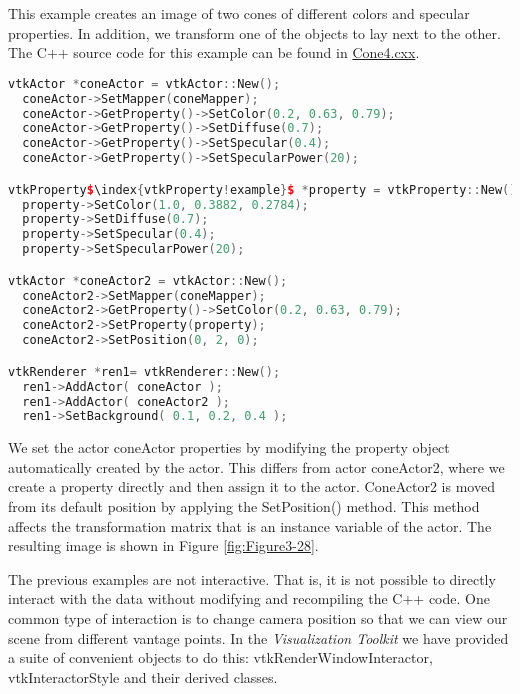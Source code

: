 \begin{description}[leftmargin=0cm,labelindent=0cm]
This example creates an image of two cones of different colors and specular properties. In addition, we transform one of the objects to lay next to the other. The C++ source code for this example can be found in \href{https://lorensen.github.io/VTKExamples/site/Cxx/Rendering/Cone4/}{Cone4.cxx}.

\begin{lstlisting}[language=C++, caption={Cone4.cxx}, escapechar=\$]
vtkActor *coneActor = vtkActor::New();
  coneActor->SetMapper(coneMapper);
  coneActor->GetProperty()->SetColor(0.2, 0.63, 0.79);
  coneActor->GetProperty()->SetDiffuse(0.7);
  coneActor->GetProperty()->SetSpecular(0.4);
  coneActor->GetProperty()->SetSpecularPower(20);

vtkProperty$\index{vtkProperty!example}$ *property = vtkProperty::New();
  property->SetColor(1.0, 0.3882, 0.2784);
  property->SetDiffuse(0.7);
  property->SetSpecular(0.4);
  property->SetSpecularPower(20);

vtkActor *coneActor2 = vtkActor::New();
  coneActor2->SetMapper(coneMapper);
  coneActor2->GetProperty()->SetColor(0.2, 0.63, 0.79);
  coneActor2->SetProperty(property);
  coneActor2->SetPosition(0, 2, 0);

vtkRenderer *ren1= vtkRenderer::New();
  ren1->AddActor( coneActor );
  ren1->AddActor( coneActor2 );
  ren1->SetBackground( 0.1, 0.2, 0.4 );
\end{lstlisting}

We set the actor coneActor properties by modifying the property object automatically created by the actor. This differs from actor coneActor2, where we create a property directly and then assign it to the actor. ConeActor2 is moved from its default position by applying the SetPosition() method. This method affects the transformation matrix that is an instance variable of the actor. The resulting image is shown in Figure \ref{fig:Figure3-28}.

\item[Introducing vtkRenderWindowInteractor]
\label{subsec:examples_introducing_vtkRenderWindowInteractor}

The previous examples are not interactive. That is, it is not possible to directly interact with the data without modifying and recompiling the C++ code. One common type of interaction is to change camera position so that we can view our scene from different vantage points. In the \emph{Visualization Toolkit} we have provided a suite of convenient objects to do this: vtkRenderWindowInteractor, vtkInteractorStyle and their derived classes.


\end{description}
